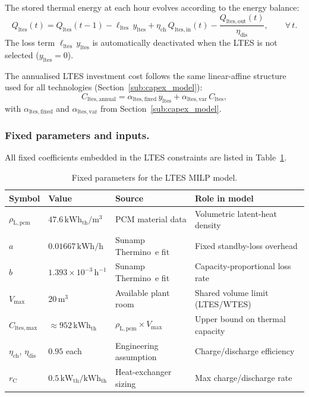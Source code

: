 \documentclass[11pt,a4paper]{report}
\begin{document}
The stored thermal energy at each hour evolves according to the energy balance:
\begin{equation}
    Q_\mathrm{ltes}(t) = Q_\mathrm{ltes}(t-1)
        - \ell_\mathrm{ltes}\,y_\mathrm{ltes}
        + \eta_\mathrm{ch}\,Q_\mathrm{ltes,in}(t)
        - \frac{Q_\mathrm{ltes,out}(t)}{\eta_\mathrm{dis}},
    \qquad \forall\,t.
    \label{eq:ltes_dyn}
\end{equation}
The loss term $\ell_\mathrm{ltes}\,y_\mathrm{ltes}$ is automatically deactivated
when the LTES is not selected ($y_\mathrm{ltes} = 0$).

The annualised LTES investment cost follows the same linear-affine structure used
for all technologies (Section~\ref{sub:capex_model}):
\begin{equation}
    C_\mathrm{ltes,annual}
        = \alpha_\mathrm{ltes,fixed}\,y_\mathrm{ltes}
        + \alpha_\mathrm{ltes,var}\,C_\mathrm{ltes},
    \label{eq:ltes_capex}
\end{equation}
with $\alpha_\mathrm{ltes,fixed}$ and $\alpha_\mathrm{ltes,var}$ from
Section~\ref{sub:capex_model}.

\subsubsection{Fixed parameters and inputs.}

All fixed coefficients embedded in the LTES constraints are listed in
Table~\ref{tab:ltes_inputs}.

\begin{table}[H]
\centering
\caption{Fixed parameters for the LTES MILP model.}
\label{tab:ltes_inputs}
\begin{tabular}{lllp{4.5cm}}
\hline
\textbf{Symbol} & \textbf{Value} & \textbf{Source} & \textbf{Role in model} \\
\hline
$\rho_\mathrm{L,pcm}$ & $47.6\,\text{kWh}_\mathrm{th}/\text{m}^3$
    & PCM material data & Volumetric latent-heat density \\
$a$ & $0.01667\,\text{kWh/h}$
    & Sunamp Thermino~e fit & Fixed standby-loss overhead \\
$b$ & $1.393\times10^{-3}\,\text{h}^{-1}$
    & Sunamp Thermino~e fit & Capacity-proportional loss rate \\
$V_\mathrm{max}$ & $20\,\text{m}^3$
    & Available plant room & Shared volume limit (LTES/WTES) \\
$C_\mathrm{ltes,max}$ & $\approx 952\,\text{kWh}_\mathrm{th}$
    & $\rho_\mathrm{L,pcm}\times V_\mathrm{max}$ & Upper bound on thermal capacity \\
$\eta_\mathrm{ch}$, $\eta_\mathrm{dis}$ & $0.95$ each
    & Engineering assumption & Charge/discharge efficiency \\
$r_\mathrm{C}$ & $0.5\,\text{kW}_\mathrm{th}/\text{kWh}_\mathrm{th}$
    & Heat-exchanger sizing & Max charge/discharge rate \\
\hline
\end{tabular}
\end{table}
\end{document}
